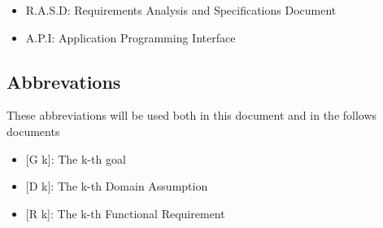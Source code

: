 \begin{itemize}
  \item R.A.S.D: Requirements Analysis and Specifications Document
  \item A.P.I: Application Programming Interface 
\end{itemize}

\subsection{Abbrevations}
These abbreviations will be used both in this document and in the follows documents
\begin{itemize}
	\item {[}G k{]}: The k-th goal
    \item {[}D k{]}: The k-th Domain Assumption
    \item {[}R k{]}: The k-th Functional Requirement
\end{itemize}
